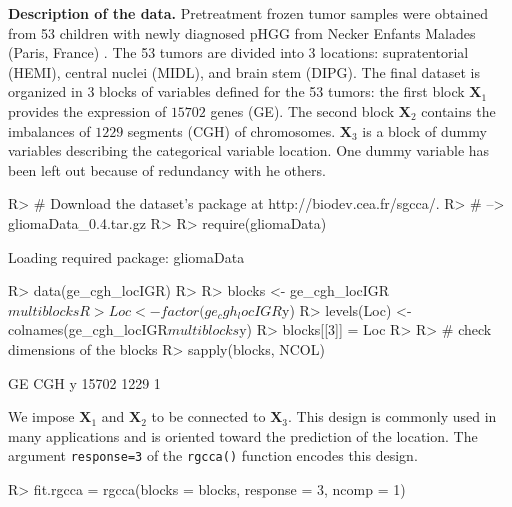 \documentclass[
]{jss}
\begin{document}
\textbf{Description of the data.} Pretreatment frozen tumor samples were
obtained from 53 children with newly diagnosed pHGG from Necker Enfants
Malades (Paris, France) \citep{Puget2012}. The 53 tumors are divided
into 3 locations: supratentorial (HEMI), central nuclei (MIDL), and
brain stem (DIPG). The final dataset is organized in 3 blocks of
variables defined for the 53 tumors: the first block
\(\ensuremath{\mathbf{X}}_1\) provides the expression of \(15702\) genes
(GE). The second block \(\ensuremath{\mathbf{X}}_2\) contains the
imbalances of \(1229\) segments (CGH) of chromosomes.
\(\ensuremath{\mathbf{X}}_3\) is a block of dummy variables describing
the categorical variable location. One dummy variable has been left out
because of redundancy with he others.

\footnotesize

\begin{CodeChunk}
\begin{CodeInput}
R> # Download the dataset's package at http://biodev.cea.fr/sgcca/.
R> # --> gliomaData_0.4.tar.gz
R> 
R> require(gliomaData)
\end{CodeInput}
\begin{CodeOutput}
Loading required package: gliomaData
\end{CodeOutput}
\begin{CodeInput}
R> data(ge_cgh_locIGR)
R> 
R> blocks <- ge_cgh_locIGR$multiblocks
R> Loc <- factor(ge_cgh_locIGR$y)
R> levels(Loc) <- colnames(ge_cgh_locIGR$multiblocks$y)
R> blocks[[3]] = Loc
R> 
R> # check dimensions of the blocks
R> sapply(blocks, NCOL)
\end{CodeInput}
\begin{CodeOutput}
   GE   CGH     y 
15702  1229     1 
\end{CodeOutput}
\end{CodeChunk}

\normalsize

We impose \(\mathbf{X}_1\) and \(\mathbf{X}_2\) to be connected to
\(\mathbf{X}_3\). This design is commonly used in many applications and
is oriented toward the prediction of the location. The argument
\texttt{response=3} of the \texttt{rgcca()} function encodes this
design.

\footnotesize

\begin{CodeChunk}
\begin{CodeInput}
R> fit.rgcca = rgcca(blocks = blocks, response = 3, ncomp = 1)
\end{CodeInput}
\end{CodeChunk}
\end{document}
